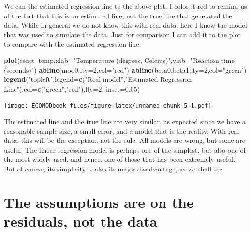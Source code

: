 \documentclass[
]{book}
\newenvironment{Shaded}{\begin{snugshade}}{\end{snugshade}}
\newcommand{\DataTypeTok}[1]{\textcolor[rgb]{0.13,0.29,0.53}{#1}}
\newcommand{\DecValTok}[1]{\textcolor[rgb]{0.00,0.00,0.81}{#1}}
\newcommand{\FloatTok}[1]{\textcolor[rgb]{0.00,0.00,0.81}{#1}}
\newcommand{\KeywordTok}[1]{\textcolor[rgb]{0.13,0.29,0.53}{\textbf{#1}}}
\newcommand{\NormalTok}[1]{#1}
\newcommand{\OperatorTok}[1]{\textcolor[rgb]{0.81,0.36,0.00}{\textbf{#1}}}
\newcommand{\StringTok}[1]{\textcolor[rgb]{0.31,0.60,0.02}{#1}}
\begin{document}
We can the estimated regression line to the above plot. I color it red to remind us of the fact that this is an estimated line, not the true line that generated the data. While in general we do not know this with real data, here I know the model that was used to simulate the data. Just for comparison I can add it to the plot to compare with the estimated regression line.

\begin{Shaded}
\begin{Highlighting}[]
\KeywordTok{plot}\NormalTok{(react}\OperatorTok{~}\NormalTok{temp,}\DataTypeTok{xlab=}\StringTok{"Temperature (degrees, Celcius)"}\NormalTok{,}\DataTypeTok{ylab=}\StringTok{"Reaction time (seconds)"}\NormalTok{)}
\KeywordTok{abline}\NormalTok{(mod0,}\DataTypeTok{lty=}\DecValTok{2}\NormalTok{,}\DataTypeTok{col=}\StringTok{"red"}\NormalTok{)}
\KeywordTok{abline}\NormalTok{(beta0,beta1,}\DataTypeTok{lty=}\DecValTok{2}\NormalTok{,}\DataTypeTok{col=}\StringTok{"green"}\NormalTok{)}
\KeywordTok{legend}\NormalTok{(}\StringTok{"topleft"}\NormalTok{,}\DataTypeTok{legend=}\KeywordTok{c}\NormalTok{(}\StringTok{"Real model"}\NormalTok{,}\StringTok{"Estimated Regression Line"}\NormalTok{),}\DataTypeTok{col=}\KeywordTok{c}\NormalTok{(}\StringTok{"green"}\NormalTok{,}\StringTok{"red"}\NormalTok{),}\DataTypeTok{lty=}\DecValTok{2}\NormalTok{, }\DataTypeTok{inset=}\FloatTok{0.05}\NormalTok{)}
\end{Highlighting}
\end{Shaded}

\texttt{[image: ECOMODbook\_files/figure-latex/unnamed-chunk-5-1.pdf]}

The estimated line and the true line are very similar, as expected since we have a reasonable sample size, a small error, and a model that is the reality. With real data, this will be the exception, not the rule. All models are wrong, but some are useful. The linear regression model is perhaps one of the simplest, but also one of the most widely used, and hence, one of those that has been extremely useful. But of course, its simplicity is also its major disadvantage, as we shall see.

\hypertarget{the-assumptions-are-on-the-residuals-not-the-data}{%
\section{The assumptions are on the residuals, not the data}\label{the-assumptions-are-on-the-residuals-not-the-data}}
\end{document}

